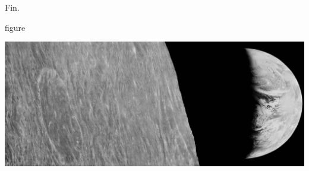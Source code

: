 \documentclass[a0,landscape]{a0poster}
\begin{document}
Fin.
\begin{staticcontents*}{figure}
\begin{staticfigure}
\includegraphics[width=\textwidth]{earthmoon_nasa_big}
\caption{A very wide figure that spans two columns} \label{fig:wide}
\end{staticfigure}
\end{staticcontents*}
\end{document}
